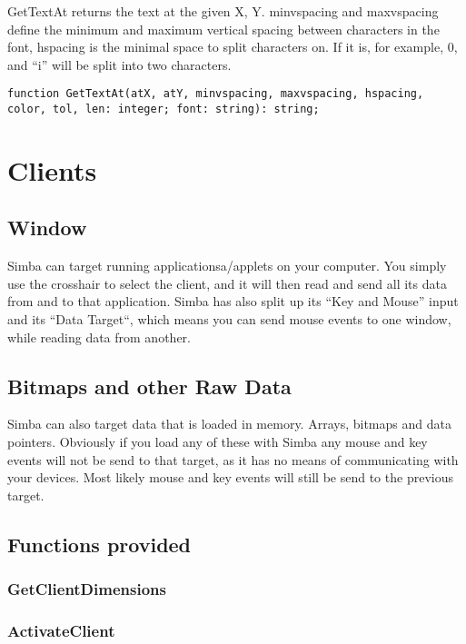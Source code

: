 \documentclass[a4paper]{report}
\begin{document}
{GetTextAt returns the text at the given X, Y.
minvspacing and maxvspacing define the minimum and maximum vertical spacing
between characters in the font, hspacing is the minimal space to split
characters on. If it is, for example, 0, and ``i'' will be split into two
characters.

\begin{verbatim}
function GetTextAt(atX, atY, minvspacing, maxvspacing, hspacing, color, tol, len: integer; font: string): string;  
\end{verbatim}

\chapter{Clients}

\section{Window}
Simba can target running applicationsa/applets on your computer. 
You simply use the crosshair to select the client, and it will then read and
send all its data from and to that application. Simba has also split up its
``Key and Mouse'' input and its ``Data Target``, which means you can send
mouse events to one window, while reading data from another.

\section{Bitmaps and other Raw Data}

Simba can also target data that is loaded in memory. Arrays, bitmaps and data
pointers. Obviously if you load any of these with Simba any mouse and key
events will not be send to that target, as it has no means of communicating
with your devices. Most likely mouse and key events will still be send to the
previous target.

\section{Functions provided}

\subsection{GetClientDimensions}

\subsection{ActivateClient}

}
\end{document}
